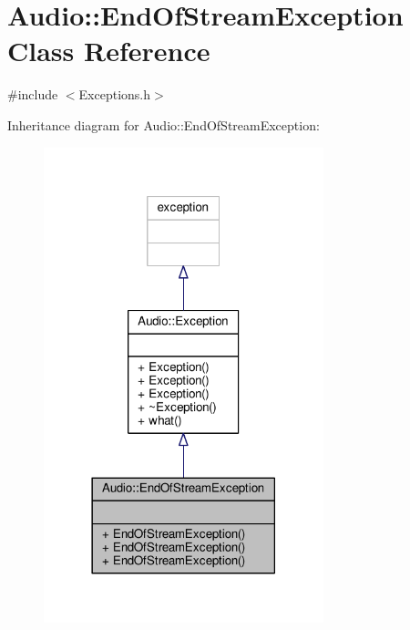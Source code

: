 \hypertarget{classAudio_1_1EndOfStreamException}{}\section{Audio\+:\+:End\+Of\+Stream\+Exception Class Reference}
\label{classAudio_1_1EndOfStreamException}


{\ttfamily \#include $<$Exceptions.\+h$>$}



Inheritance diagram for Audio\+:\+:End\+Of\+Stream\+Exception\+:
\nopagebreak
\begin{figure}[H]
\begin{center}
\leavevmode
\includegraphics[width=230pt]{df/d1a/classAudio_1_1EndOfStreamException__inherit__graph}
\end{center}
\end{figure}


